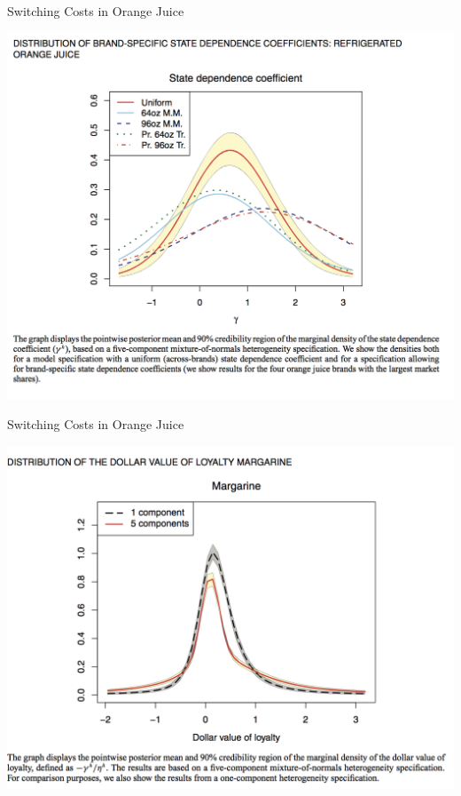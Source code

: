 \documentclass[xcolor=pdftex,dvipsnames,table,mathserif]{beamer}
\begin{document}
\begin{frame}{Switching Costs in Orange Juice}
\begin{center}
\includegraphics[scale=0.33]{resources/OJ_F8.png}
\end{center}
\end{frame}


\begin{frame}{Switching Costs in Orange Juice}
\begin{center}
\includegraphics[scale=0.33]{resources/OJ_F11.png}
\end{center}
\end{frame}
\end{document}
